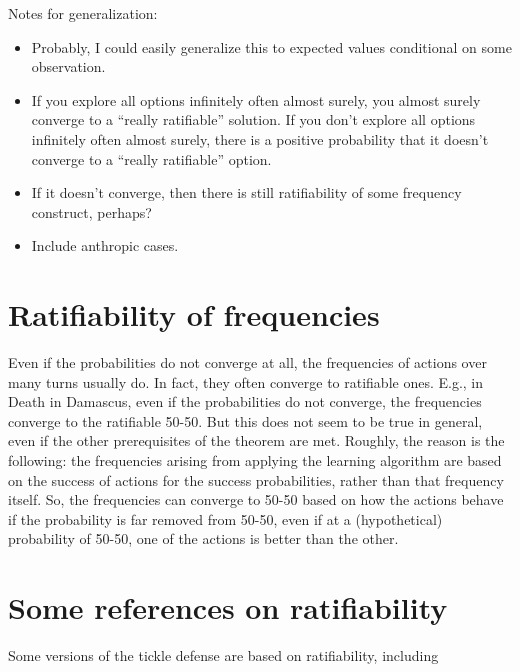 \documentclass{article}
\begin{document}
Notes for generalization:
\begin{itemize}
\item Probably, I could easily generalize this to expected values conditional on some observation.
\item If you explore all options infinitely often almost surely, you almost surely converge to a \enquote{really ratifiable} solution. If you don't explore all options infinitely often almost surely, there is a positive probability that it doesn't converge to a \enquote{really ratifiable} option.
\item If it doesn't converge, then there is still ratifiability of some frequency construct, perhaps?
\item Include anthropic cases.
\end{itemize}

\section*{Ratifiability of frequencies}

Even if the probabilities do not converge at all, the frequencies of actions over many turns usually do. In fact, they often converge to ratifiable ones. E.g., in Death in Damascus, even if the probabilities do not converge, the frequencies converge to the ratifiable 50-50. But this does not seem to be true in general, even if the other prerequisites of the theorem are met. Roughly, the reason is the following: the frequencies arising from applying the learning algorithm are based on the success of actions for the success probabilities, rather than that frequency itself. So, the frequencies can converge to 50-50 based on how the actions behave if the probability is far removed from 50-50, even if at a (hypothetical) probability of 50-50, one of the actions is better than the other.

\section*{Some references on ratifiability}

Some versions of the tickle defense are based on ratifiability, including 
\end{document}
